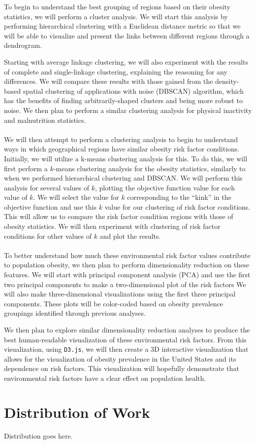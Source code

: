 \documentclass{article}
\begin{document}
To begin to understand the best grouping of regions based on their obesity statistics, we will perform a cluster analysis. We will start this analysis by performing hierarchical clustering with a Euclidean distance metric so that we will be able to visualize and present the links between different regions through a dendrogram. 

Starting with average linkage clustering, we will also experiment with the results of complete and single-linkage clustering, explaining the reasoning for any differences. 
We will compare these results with those gained from the density-based spatial clustering of applications with noise (DBSCAN) algorithm, which has the benefits of finding arbitrarily-shaped clusters and being more robust to noise. 
We then plan to perform a similar clustering analysis for physical inactivity and malnutrition statistics.
\\\\
We will then attempt to perform a clustering analysis to begin to understand ways in which geographical regions have similar obesity risk factor conditions. 
Initially, we will utilize a k-means clustering analysis for this. To do this, we will first perform a $k$-means clustering analysis for the obesity statistics, similarly to when we performed hierarchical clustering and DBSCAN. 
We will perform this analysis for several values of $k$, plotting the objective function value for each value of $k$. We will select the value for $k$ corresponding to the “kink” in the objective function and use this $k$ value for our clustering of risk factor conditions. This will allow us to compare the risk factor condition regions with those of obesity statistics. We will then experiment with clustering of risk factor conditions for other values of $k$ and plot the results.
\\\\
To better understand how much these environmental risk factor values contribute to population obesity, we then plan to perform dimensionality reduction on these features. We will start with principal component analysis (PCA) and use the first two principal components to make a two-dimensional plot of the risk factors 
We will also make three-dimensional visualizations using the first three principal components. These plots will be color-coded based on obesity prevalence groupings identified through previous analyses.

We then plan to explore similar dimensionality reduction analyses to produce the best human-readable visualization of these environmental risk factors. From this visualization, using \verb|D3.js|, we will then create a 3D interactive visualization that allows for the visualization of obesity prevalence in the United States and its dependence on risk factors. This visualization will hopefully demonstrate that environmental risk factors have a clear effect on population health.

\section{Distribution of Work}
\label{distribution}

Distribution goes here.




\end{document}

